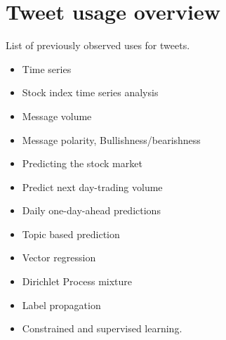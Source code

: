 \chapter{Tweet usage overview}
List of previously observed uses for tweets. 
\begin{itemize}
    \item Time series
    \item Stock index time series analysis
    \item Message volume
    \item Message polarity, Bullishness/bearishness
    \item Predicting the stock market
    \item Predict next day-trading volume
    \item Daily one-day-ahead predictions
    \item Topic based prediction
    \item Vector regression
    \item Dirichlet Process mixture
    \item Label propagation
    \item Constrained and supervised learning. 
\end{itemize}
